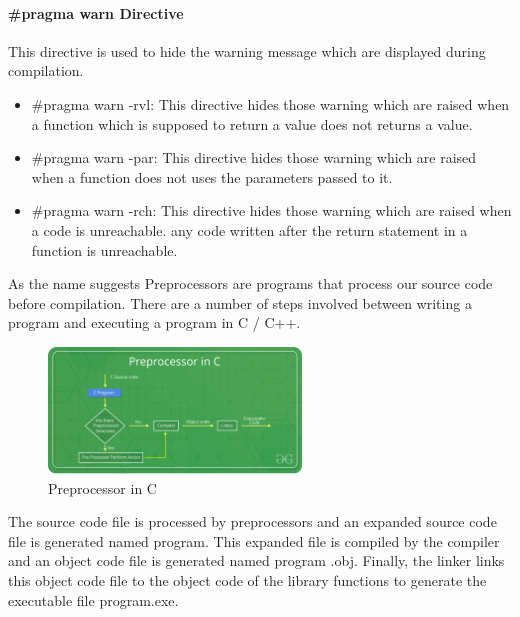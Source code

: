 \paragraph{\#pragma warn Directive}
This directive is used to hide the warning message which are displayed during compilation. 

\begin{itemize}
    \item \#pragma warn -rvl: This directive hides those warning which are raised when a function which is supposed to return a value does not returns a value.
    \item \#pragma warn -par: This directive hides those warning which are raised when a function does not uses the parameters passed to it.
    \item \#pragma warn -rch: This directive hides those warning which are raised when a code is unreachable. \eg any code written after the return statement in a function is unreachable.
\end{itemize}



\iffalse

As the name suggests Preprocessors are programs that process our source code before compilation. There are a number of steps involved between writing a program and executing a program in C / C++. 


\begin{figure}[H]
    \begin{center}
        \includegraphics[width=0.6\textwidth]{images/Cpreprocessor.png}
        \caption{Preprocessor in C}
        \label{Cpreprocessor}
    \end{center}
\end{figure}

The source code file is processed by preprocessors and an expanded source code file is generated named program. This expanded file is compiled by the compiler and an object code file is generated named program .obj. Finally, the linker links this object code file to the object code of the library functions to generate the executable file program.exe.

